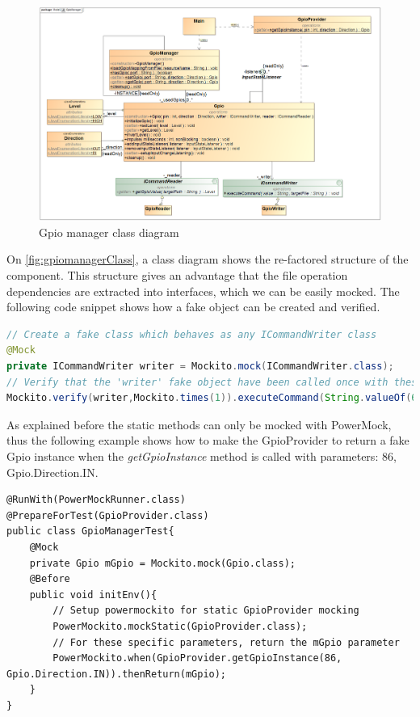 \begin{figure}[ht]
	\centering
	\includegraphics[width=150mm, keepaspectratio]{figures/impl/GpioManager.png}
	\caption{Gpio manager class diagram}
	\label{fig:gpiomanagerClass}
\end{figure}
On \autoref{fig:gpiomanagerClass}, a class diagram shows the re-factored structure of the component. This structure gives an advantage that the file operation dependencies are extracted into interfaces, which we can be easily mocked. The following code snippet shows how a fake object can be created and verified. 

\begin{lstlisting}[language = Java]
// Create a fake class which behaves as any ICommandWriter class
@Mock
private ICommandWriter writer = Mockito.mock(ICommandWriter.class);
// Verify that the 'writer' fake object have been called once with these exact parameters
Mockito.verify(writer,Mockito.times(1)).executeCommand(String.valueOf(67),"/sys/class/gpio/export");
\end{lstlisting}

As explained before the static methods can only be mocked with PowerMock, thus the following example shows how to make the GpioProvider to return a fake Gpio instance when the \textit{getGpioInstance} method is called with parameters: 86, Gpio.Direction.IN.

\begin{lstlisting}
@RunWith(PowerMockRunner.class)
@PrepareForTest(GpioProvider.class)
public class GpioManagerTest{
	@Mock
	private Gpio mGpio = Mockito.mock(Gpio.class);
	@Before
	public void initEnv(){
		// Setup powermockito for static GpioProvider mocking
		PowerMockito.mockStatic(GpioProvider.class);
		// For these specific parameters, return the mGpio parameter
		PowerMockito.when(GpioProvider.getGpioInstance(86, Gpio.Direction.IN)).thenReturn(mGpio);
	}
}
\end{lstlisting}

